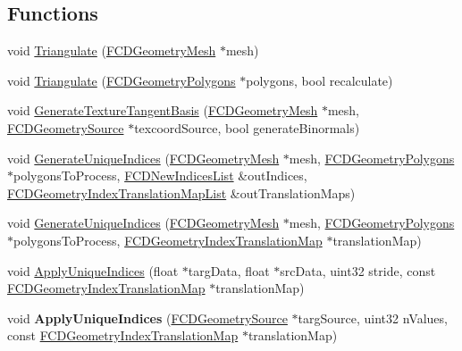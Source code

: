 \subsection*{Functions}
\begin{DoxyCompactItemize}
\item 
void \hyperlink{namespaceFCDGeometryPolygonsTools_acc34609095c4d934983f65f5bf068d3d}{Triangulate} (\hyperlink{classFCDGeometryMesh}{FCDGeometryMesh} $\ast$mesh)
\item 
void \hyperlink{namespaceFCDGeometryPolygonsTools_acf2b155dd5781c2a781841097c745396}{Triangulate} (\hyperlink{classFCDGeometryPolygons}{FCDGeometryPolygons} $\ast$polygons, bool recalculate)
\item 
void \hyperlink{namespaceFCDGeometryPolygonsTools_ac750730d04e82ff25157d06bb77996ce}{GenerateTextureTangentBasis} (\hyperlink{classFCDGeometryMesh}{FCDGeometryMesh} $\ast$mesh, \hyperlink{classFCDGeometrySource}{FCDGeometrySource} $\ast$texcoordSource, bool generateBinormals)
\item 
void \hyperlink{namespaceFCDGeometryPolygonsTools_a7541340d15de908be8cc7f95d568d32c}{GenerateUniqueIndices} (\hyperlink{classFCDGeometryMesh}{FCDGeometryMesh} $\ast$mesh, \hyperlink{classFCDGeometryPolygons}{FCDGeometryPolygons} $\ast$polygonsToProcess, \hyperlink{classfm_1_1vector}{FCDNewIndicesList} \&outIndices, \hyperlink{classfm_1_1pvector}{FCDGeometryIndexTranslationMapList} \&outTranslationMaps)
\item 
void \hyperlink{namespaceFCDGeometryPolygonsTools_af02df362078a3e7467a978862fbf99d5}{GenerateUniqueIndices} (\hyperlink{classFCDGeometryMesh}{FCDGeometryMesh} $\ast$mesh, \hyperlink{classFCDGeometryPolygons}{FCDGeometryPolygons} $\ast$polygonsToProcess, \hyperlink{classfm_1_1map}{FCDGeometryIndexTranslationMap} $\ast$translationMap)
\item 
void \hyperlink{namespaceFCDGeometryPolygonsTools_ad2bfb87fea582dbdd9dcc2021d9e5628}{ApplyUniqueIndices} (float $\ast$targData, float $\ast$srcData, uint32 stride, const \hyperlink{classfm_1_1map}{FCDGeometryIndexTranslationMap} $\ast$translationMap)
\item 
\hypertarget{namespaceFCDGeometryPolygonsTools_af5bbb2041c56544d97232372e5856ceb}{
void {\bfseries ApplyUniqueIndices} (\hyperlink{classFCDGeometrySource}{FCDGeometrySource} $\ast$targSource, uint32 nValues, const \hyperlink{classfm_1_1map}{FCDGeometryIndexTranslationMap} $\ast$translationMap)}
\label{namespaceFCDGeometryPolygonsTools_af5bbb2041c56544d97232372e5856ceb}


\end{DoxyCompactItemize}
